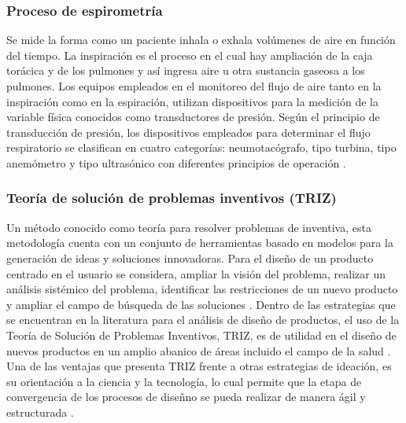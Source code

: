 \documentclass[12pt]{article}
\begin{document}
\subsubsection{Proceso de espirometr\'ia}
Se mide la forma como un paciente inhala o exhala vol\'umenes de aire en funci\'on del tiempo. La inspiraci\'on es el proceso en el cual hay ampliaci\'on de la caja tor\'acica y de los pulmones y as\'i ingresa aire u otra sustancia gaseosa a los pulmones. Los equipos empleados en el monitoreo del flujo de aire tanto en la inspiraci\'on como en la espiraci\'on, utilizan dispositivos para la medici\'on de la variable f\'isica conocidos como transductores de presi\'on. Seg\'un el principio de transducci\'on de presi\'on, los dispositivos empleados para determinar el flujo respiratorio se clasifican en cuatro categor\'ias: neumotac\'ografo, tipo turbina, tipo anem\'ometro y tipo ultras\'onico con diferentes principios de operaci\'on \cite{14}. 



\subsubsection{Teor\'ia de soluci\'on de problemas inventivos (TRIZ)}

Un m\'etodo conocido como teor\'ia para resolver problemas de inventiva, esta metodolog\'ia cuenta con un conjunto de herramientas basado en modelos para la generaci\'on de ideas y soluciones innovadoras. Para el dise\~{n}o de un producto centrado en el usuario se considera, ampliar la visi\'on del problema, realizar un an\'alisis sist\'emico del problema, identificar las restricciones de un nuevo producto y ampliar el campo de b\'usqueda de las soluciones \cite{15}.  Dentro de las estrategias que se encuentran en la literatura para el an\'alisis de dise\~{n}o de productos, el uso de la Teor\'ia de Soluci\'on de Problemas Inventivos, TRIZ, es de utilidad en el dise\~{n}o de nuevos productos en un amplio abanico de \'areas incluido el campo de la salud \cite{16}.  Una de las ventajas que presenta TRIZ frente a otras estrategias de ideaci\'on, es su orientaci\'on a la ciencia y la tecnolog\'ia, lo cual permite que la etapa de convergencia de los procesos de dise\~{n}no se pueda realizar de manera \'agil y estructurada \cite{17}. 








\end{document}
